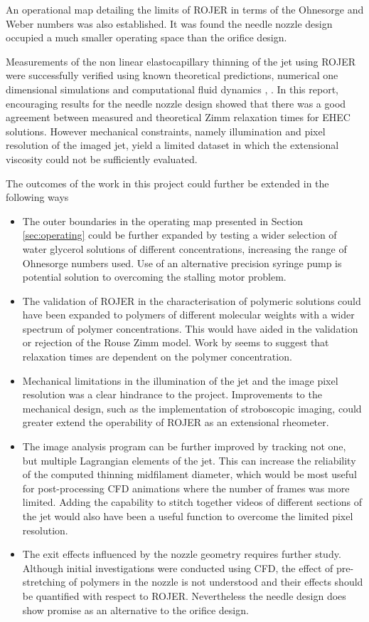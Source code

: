 \documentclass[11pt]{article}
\begin{document}
An operational map detailing the limits of ROJER in terms of the Ohnesorge and Weber numbers was also established. It was found the needle nozzle design occupied a much smaller operating space than the orifice design.

Measurements of the non linear elastocapillary thinning of the jet using ROJER were successfully verified using known theoretical predictions, numerical one dimensional simulations \citep{hall2015report} and computational fluid dynamics \citep{gorbatenko2015report}, \citep{greiciunas2015report}. In this report, encouraging results for the needle nozzle design showed that there was a good agreement between measured and theoretical Zimm relaxation times for EHEC solutions. However mechanical constraints, namely illumination and pixel resolution of the imaged jet, yield a limited dataset in which the extensional viscosity could not be sufficiently evaluated.

The outcomes of the work in this project could further be extended in the following ways
\begin{itemize}
	\item The outer boundaries in the operating map presented in Section \ref{sec:operating} could be further expanded by testing a wider selection of water glycerol solutions of different concentrations, increasing the range of Ohnesorge numbers used. Use of an alternative precision syringe pump is potential solution to overcoming the stalling motor problem.
	\item The validation of ROJER in the characterisation of polymeric solutions could have been expanded to polymers of different molecular weights with a wider spectrum of polymer concentrations. This would have aided in the validation or rejection of the Rouse Zimm model. Work by \cite{clasen2006dilute} seems to suggest that relaxation times are dependent on the polymer concentration.
	\item Mechanical limitations in the illumination of the jet and the image pixel resolution was a clear hindrance to the project. Improvements to the mechanical design, such as the implementation of stroboscopic imaging, could greater extend the operability of ROJER  as an extensional rheometer.
	\item The image analysis program can be further improved by tracking not one, but multiple Lagrangian elements of the jet. This can increase the reliability of the computed thinning midfilament diameter, which would be most useful for post-processing CFD animations where the number of frames was more limited. Adding the capability to stitch together videos of different sections of the jet would also have been a useful function to overcome the limited pixel resolution.
	\item The exit effects influenced by the nozzle geometry requires further study. Although initial investigations were conducted using CFD, the effect of pre-stretching of polymers in the nozzle is not understood and their effects should be quantified with respect to ROJER. Nevertheless the needle design does show promise as an alternative to the orifice design.
\end{itemize}
\end{document}
